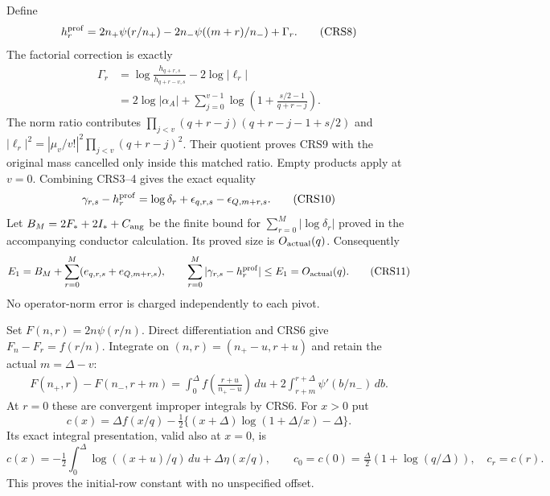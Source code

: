 Define
\[
 h_r^{\rm prof}=2n_+\psi(r/n_+)-2n_-\psi((m+r)/n_-)+\Gamma_r.
                                                               \tag{CRS8}
\]
The factorial correction is exactly
\[
\begin{split}
 \Gamma_r&=\log\frac{h_{q+r,s}}{h_{q+r-v,s}}-2\log|\ell_r|\\
 &=2\log|\alpha_A|+
   \sum_{j=0}^{v-1}\log\left(1+\frac{s/2-1}{q+r-j}\right).
\end{split}                                                    \tag{CRS9}
\]
The norm ratio contributes
$\prod_{j<v}(q+r-j)(q+r-j-1+s/2)$ and
$|\ell_r|^2=|\mu_v/v!|^2\prod_{j<v}(q+r-j)^2$.
Their quotient proves CRS9 with the original mass cancelled only
inside this matched ratio. Empty products apply at $v=0$.
Combining CRS3--4 gives the exact equality
\[
 \gamma_{r,s}-h_r^{\rm prof}
   =\log\delta_r+\epsilon_{q,r,s}-\epsilon_{Q,m+r,s}.  \tag{CRS10}
\]
Let $B_M=2F_*+2I_*+C_{\rm ang}$ be the finite bound for
$\sum_{r=0}^M|\log\delta_r|$ proved in the accompanying conductor
calculation. Its proved size is $O_{\rm actual}(q)$.
Consequently
\[
 E_1=B_M+\sum_{r=0}^M(e_{q,r,s}+e_{Q,m+r,s}),\qquad
 \sum_{r=0}^M|\gamma_{r,s}-h_r^{\rm prof}|
 \le E_1=O_{\rm actual}(q).                           \tag{CRS11}
\]
No operator-norm error is charged independently to each pivot.

Set $F(n,r)=2n\psi(r/n)$. Direct differentiation and CRS6 give
$F_n-F_r=f(r/n)$. Integrate on $(n,r)=(n_+-u,r+u)$ and retain
the actual $m=\Delta-v$:
\[
\begin{split}
 F(n_+,r)-F(n_-,r+m)
 =\int_0^\Delta f\left(\frac{r+u}{n_+-u}\right)\,du
       +2\int_{r+m}^{r+\Delta}\psi'(b/n_-)\,db .
\end{split}                                                    \tag{CRS12}
\]
At $r=0$ these are convergent improper integrals by CRS6.
For $x>0$ put
\[
 c(x)=\Delta f(x/q)
 -\tfrac12\{(x+\Delta)\log(1+\Delta/x)-\Delta\}.        \tag{CRS13}
\]
Its exact integral presentation, valid also at $x=0$, is
\[
 c(x)=-\tfrac12\int_0^\Delta\log((x+u)/q)\,du
                     +\Delta\eta(x/q),\qquad
 c_0=c(0)=\tfrac{\Delta}{2}(1+\log(q/\Delta)),\quad c_r=c(r).
                                                               \tag{CRS14}
\]
This proves the initial-row constant with no unspecified offset.

